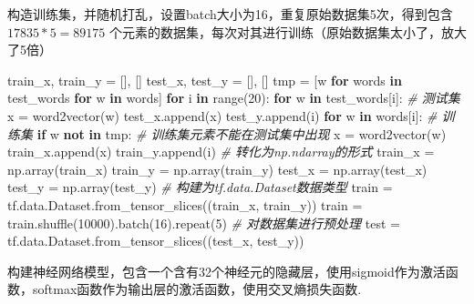 \documentclass[
]{article}
\newenvironment{Shaded}{}{}
\newcommand{\BuiltInTok}[1]{#1}
\newcommand{\CommentTok}[1]{\textcolor[rgb]{0.38,0.63,0.69}{\textit{#1}}}
\newcommand{\ControlFlowTok}[1]{\textcolor[rgb]{0.00,0.44,0.13}{\textbf{#1}}}
\newcommand{\DecValTok}[1]{\textcolor[rgb]{0.25,0.63,0.44}{#1}}
\newcommand{\KeywordTok}[1]{\textcolor[rgb]{0.00,0.44,0.13}{\textbf{#1}}}
\newcommand{\NormalTok}[1]{#1}
\newcommand{\OperatorTok}[1]{\textcolor[rgb]{0.40,0.40,0.40}{#1}}
\begin{document}
构造训练集，并随机打乱，设置batch大小为16，重复原始数据集5次，得到包含
\(17835*5=89175\)
个元素的数据集，每次对其进行训练（原始数据集太小了，放大了5倍）

\begin{Shaded}
\begin{Highlighting}[]
\NormalTok{train\_x, train\_y }\OperatorTok{=}\NormalTok{ [], []}
\NormalTok{test\_x, test\_y }\OperatorTok{=}\NormalTok{ [], []}
\NormalTok{tmp }\OperatorTok{=}\NormalTok{ [w }\ControlFlowTok{for}\NormalTok{ words }\KeywordTok{in}\NormalTok{ test\_words }\ControlFlowTok{for}\NormalTok{ w  }\KeywordTok{in}\NormalTok{ words]}
\ControlFlowTok{for}\NormalTok{ i }\KeywordTok{in} \BuiltInTok{range}\NormalTok{(}\DecValTok{20}\NormalTok{):}
    \ControlFlowTok{for}\NormalTok{ w }\KeywordTok{in}\NormalTok{ test\_words[i]:  }\CommentTok{\# 测试集}
\NormalTok{        x }\OperatorTok{=}\NormalTok{ word2vector(w)}
\NormalTok{        test\_x.append(x)}
\NormalTok{        test\_y.append(i)}
    \ControlFlowTok{for}\NormalTok{ w }\KeywordTok{in}\NormalTok{ words[i]:  }\CommentTok{\# 训练集}
        \ControlFlowTok{if}\NormalTok{ w }\KeywordTok{not} \KeywordTok{in}\NormalTok{ tmp:  }\CommentTok{\# 训练集元素不能在测试集中出现}
\NormalTok{            x }\OperatorTok{=}\NormalTok{ word2vector(w)}
\NormalTok{            train\_x.append(x)}
\NormalTok{            train\_y.append(i)}
\CommentTok{\# 转化为np.ndarray的形式}
\NormalTok{train\_x }\OperatorTok{=}\NormalTok{ np.array(train\_x)}
\NormalTok{train\_y }\OperatorTok{=}\NormalTok{ np.array(train\_y)}
\NormalTok{test\_x }\OperatorTok{=}\NormalTok{ np.array(test\_x)}
\NormalTok{test\_y }\OperatorTok{=}\NormalTok{ np.array(test\_y)}
\CommentTok{\# 构建为tf.data.Dataset数据类型}
\NormalTok{train }\OperatorTok{=}\NormalTok{ tf.data.Dataset.from\_tensor\_slices((train\_x, train\_y))}
\NormalTok{train }\OperatorTok{=}\NormalTok{ train.shuffle(}\DecValTok{10000}\NormalTok{).batch(}\DecValTok{16}\NormalTok{).repeat(}\DecValTok{5}\NormalTok{)  }\CommentTok{\# 对数据集进行预处理}
\NormalTok{test }\OperatorTok{=}\NormalTok{ tf.data.Dataset.from\_tensor\_slices((test\_x, test\_y))}
\end{Highlighting}
\end{Shaded}

构建神经网络模型，包含一个含有32个神经元的隐藏层，使用sigmoid作为激活函数，softmax函数作为输出层的激活函数，使用交叉熵损失函数.
\end{document}
